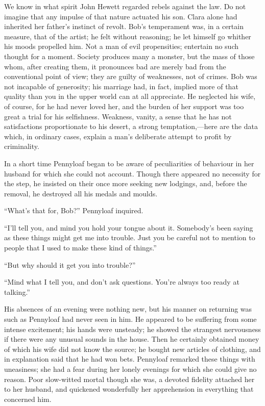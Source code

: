 We know in what spirit John Hewett regarded rebels against the law. Do
not imagine that any impulse of that nature actuated his son. Clara
alone had inherited her father's instinct of revolt. Bob's temperament
was, in a certain measure, that of the artist; he felt without
reasoning; he let himself go whither his moods propelled him. Not a man
of evil propensities; entertain no such thought for a moment. Society
produces many a monster, but the mass of those whom, after creating
them, it pronounces bad are merely bad from the conventional point of
view; they are guilty of weaknesses, not of crimes. Bob was not
incapable of generosity; his marriage had, in fact, implied more of that
quality than you in the upper world can at all appreciate. He neglected
his wife, of {\protect\hypertarget{238}{}{}}course, for he had never
loved her, and the burden of her support was too great a trial for his
selfishness. Weakness, vanity, a sense that he has not satisfactions
proportionate to his desert, a strong temptation,---here are the data
which, in ordinary cases, explain a man's deliberate attempt to profit
by criminality.

In a short time Pennyloaf began to be aware of peculiarities of
behaviour in her husband for which she could not account. Though there
appeared no necessity for the step, he insisted on their once more
seeking new lodgings, and, before the removal, he destroyed all his
medals and moulds.

``What's that for, Bob?'' Pennyloaf inquired.

``I'll tell you, and mind you hold your tongue about it. Somebody's been
saying as these things might get me into trouble. Just you be careful
not to mention to people that I used to make these kind of things.''

``But why should it get you into trouble?''

``Mind what I tell you, and don't ask questions. You're always too ready
at talking.''

{\protect\hypertarget{239}{}{}}His absences of an evening were nothing
new, but his manner on returning was such as Pennyloaf had never seen in
him. He appeared to be suffering from some intense excitement; his hands
were unsteady; he showed the strangest nervousness if there were any
unusual sounds in the house. Then he certainly obtained money of which
his wife did not know the source; he bought new articles of clothing,
and in explanation said that he had won bets. Pennyloaf remarked these
things with uneasiness; she had a fear during her lonely evenings for
which she could give no reason. Poor slow-witted mortal though she was,
a devoted fidelity attached her to her husband, and quickened
wonderfully her apprehension in everything that concerned him.


